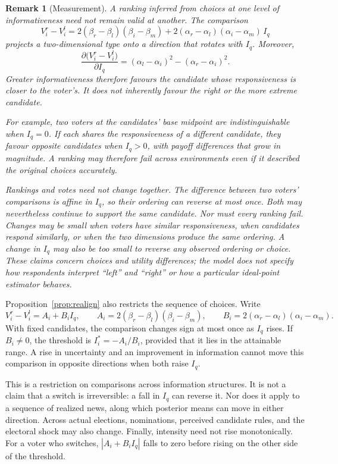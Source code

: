 \documentclass[12pt,letterpaper]{article}
\newtheorem{remark}{Remark}
\begin{document}
\begin{remark}[Measurement]\label{rem:measurement}
A ranking inferred from choices at one level of informativeness need not remain valid at another. The comparison
\[
V_i^r-V_i^l=2(\beta_r-\beta_l)(\beta_i-\beta_m)+2(\alpha_r-\alpha_l)(\alpha_i-\alpha_m)\,I_q
\]
projects a two-dimensional type onto a direction that rotates with $I_q$. Moreover,
\[
\frac{\partial\big(V_i^r-V_i^l\big)}{\partial I_q}=(\alpha_l-\alpha_i)^2-(\alpha_r-\alpha_i)^2 .
\]
Greater informativeness therefore favours the candidate whose responsiveness is closer to the voter's. It does not inherently favour the right or the more extreme candidate.

For example, two voters at the candidates' base midpoint are indistinguishable when $I_q=0$. If each shares the responsiveness of a different candidate, they favour opposite candidates when $I_q>0$, with payoff differences that grow in magnitude. A ranking may therefore fail across environments even if it described the original choices accurately.

Rankings and votes need not change together. The difference between two voters' comparisons is affine in $I_q$, so their ordering can reverse at most once. Both may nevertheless continue to support the same candidate. Nor must every ranking fail. Changes may be small when voters have similar responsiveness, when candidates respond similarly, or when the two dimensions produce the same ordering. A change in $I_q$ may also be too small to reverse any observed ordering or choice. These claims concern choices and utility differences; the model does not specify how respondents interpret ``left'' and ``right'' or how a particular ideal-point estimator behaves.
\end{remark}

Proposition~\ref{prop:realign} also restricts the sequence of choices. Write
\[
V_i^r-V_i^l=A_i+B_iI_q,
\qquad
A_i=2(\beta_r-\beta_l)(\beta_i-\beta_m),
\qquad
B_i=2(\alpha_r-\alpha_l)(\alpha_i-\alpha_m).
\]
With fixed candidates, the comparison changes sign at most once as $I_q$ rises. If $B_i\ne0$, the threshold is $I_i^*=-A_i/B_i$, provided that it lies in the attainable range. A rise in uncertainty and an improvement in information cannot move this comparison in opposite directions when both raise $I_q$.

This is a restriction on comparisons across information structures. It is not a claim that a switch is irreversible: a fall in $I_q$ can reverse it. Nor does it apply to a sequence of realized news, along which posterior means can move in either direction. Across actual elections, nominations, perceived candidate rules, and the electoral shock may also change. Finally, intensity need not rise monotonically. For a voter who switches, $|A_i+B_iI_q|$ falls to zero before rising on the other side of the threshold.
\end{document}
